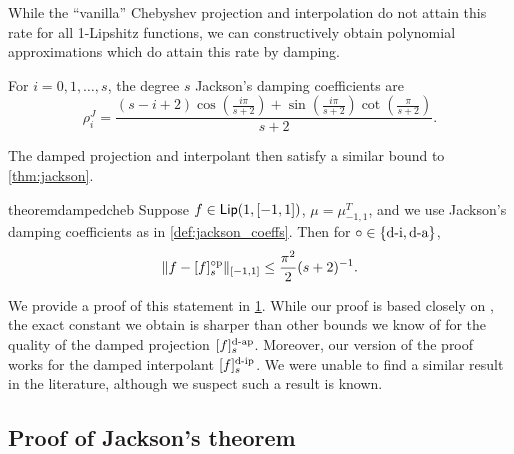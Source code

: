 While the ``vanilla'' Chebyshev projection and interpolation do not attain this rate for all 1-Lipshitz functions, we can constructively obtain polynomial approximations which do attain this rate by damping.
\begin{definition}
\label{def:jackson_coeffs}
For \( i=0,1,\ldots, s \), the degree \( s \) Jackson's damping coefficients are
\begin{equation*}
    \rho_{i}^{J}
    = \frac{(s-i+2)\cos \left( \frac{i \pi}{s+2} \right) + \sin \left( \frac{i \pi}{s+2} \right)\cot \left( \frac{\pi}{s+2} \right)}{s+2}.
\end{equation*}
\end{definition}
The damped projection and interpolant then satisfy a similar bound to \cref{thm:jackson}.
\begin{restatable}{theorem}{dampedcheb}
    \label{thm:damped_cheb}
    Suppose \( f \in \textup{\textsf{Lip}}(1,[-1,1]) \), \( \mu  = \mu_{-1,1}^T \), and we use Jackson's damping coefficients as in \cref{def:jackson_coeffs}.
    Then for \( \circ \in \{ \textup{d-i}, \textup{d-a} \} \),
    \begin{equation*}
        \| f - \ff[]{f}{s} \|_{[-1,1]} \leq \frac{\pi^2}{2} (s+2)^{-1}.
    \end{equation*}
\end{restatable}
We provide a proof of this statement in \cref{sec:damped_cheb}.
While our proof is based closely on \cite{rivlin_81}, the exact constant we obtain is sharper than other bounds we know of for the quality of the damped projection \( \ff[d-a]{f}{s} \).
Moreover, our version of the proof works for the damped interpolant \( \ff[d-i]{f}{s} \). 
We were unable to find a similar result in the literature, although we suspect such a result is known.


\begin{subappendices}
\section{Proof of Jackson's theorem}
\label{sec:damped_cheb}

\end{subappendices}







